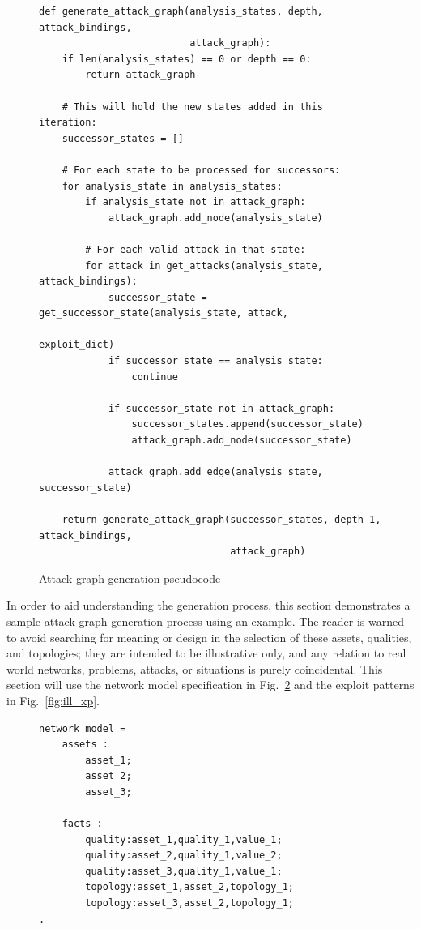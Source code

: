 \begin{figure}
\begin{lstlisting}
def generate_attack_graph(analysis_states, depth, attack_bindings,
                          attack_graph):
    if len(analysis_states) == 0 or depth == 0:
        return attack_graph
    
    # This will hold the new states added in this iteration:
    successor_states = []

    # For each state to be processed for successors:
    for analysis_state in analysis_states:
        if analysis_state not in attack_graph:
            attack_graph.add_node(analysis_state)

        # For each valid attack in that state:
        for attack in get_attacks(analysis_state, attack_bindings):
            successor_state = get_successor_state(analysis_state, attack,
                                                  exploit_dict)
            if successor_state == analysis_state:
                continue
                
            if successor_state not in attack_graph:
                successor_states.append(successor_state)
                attack_graph.add_node(successor_state)
            
            attack_graph.add_edge(analysis_state, successor_state)
            
    return generate_attack_graph(successor_states, depth-1, attack_bindings,
                                 attack_graph)
\end{lstlisting}
\label{fig:ag_generation_pc}
\caption{Attack graph generation pseudocode}
\end{figure}
In order to aid understanding the generation process, this section demonstrates a
sample attack graph generation process using an example. The reader is warned to
avoid searching for meaning or design in the selection of these assets, qualities,
and topologies; they are intended to be illustrative only, and any relation to 
real world networks, problems, attacks, or situations is purely coincidental.
This section will use the network model specification in Fig.~\ref{fig:ill_nm}
and the exploit patterns in Fig.~\ref{fig:ill_xp}.
\begin{figure}
\begin{lstlisting}
network model = 
    assets :
        asset_1;
        asset_2;
        asset_3;

    facts :
        quality:asset_1,quality_1,value_1;
        quality:asset_2,quality_1,value_2;
        quality:asset_3,quality_1,value_1;
        topology:asset_1,asset_2,topology_1;
        topology:asset_3,asset_2,topology_1;
.
\end{lstlisting}
\label{fig:ill_nm}
\end{figure}


